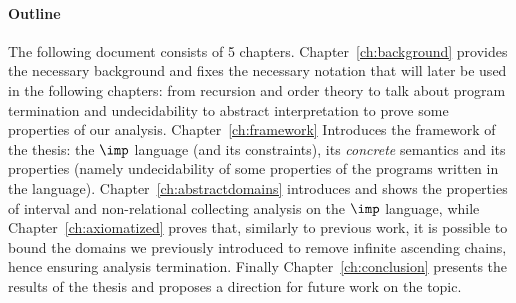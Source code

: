 \paragraph*{Outline}
The following document consists of 5
chapters. Chapter~\ref{ch:background} provides the necessary
background and fixes the necessary notation that will later be used in
the following chapters: from recursion and order theory to talk about
program termination and undecidability to abstract interpretation to
prove some properties of our analysis. Chapter~\ref{ch:framework}
Introduces the framework of the thesis: the \(\imp\) language (and its
constraints), its \emph{concrete} semantics and its properties (namely
undecidability of some properties of the programs written in the
language). Chapter~\ref{ch:abstractdomains} introduces and shows the
properties of interval and non-relational collecting analysis on the
\(\imp\) language, while Chapter~\ref{ch:axiomatized} proves that,
similarly to previous work, it is possible to bound the domains we
previously introduced to remove infinite ascending chains, hence
ensuring analysis termination. Finally Chapter~\ref{ch:conclusion}
presents the results of the thesis and proposes a direction for future
work on the topic.
